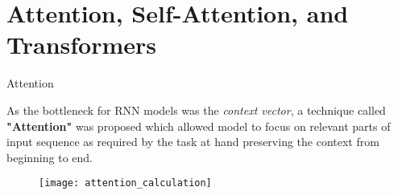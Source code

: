 \documentclass[10pt]{beamer}
\begin{document}
\section[Attention, Self-Attention, and Transformers]{Attention, Self-Attention, and Transformers}

%
%
%

\begin{frame}[fragile]{Attention}

	As the bottleneck for RNN models was the \textit{context vector}, a technique called \textbf{"Attention"} was
	proposed which allowed model to focus on relevant parts of input sequence as required by the task at hand preserving
	the context from beginning to end.

	\begin{figure}[h]
		\centering
		\texttt{[image: attention\_calculation]}
	\end{figure}


\end{frame}
\end{document}
